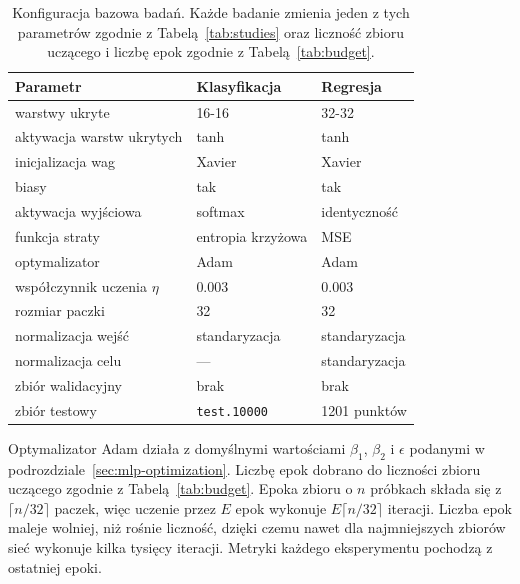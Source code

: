\begin{table}[H]
    \centering
    \caption{Konfiguracja bazowa badań. Każde badanie zmienia jeden z tych parametrów zgodnie z Tabelą~\ref{tab:studies} oraz liczność zbioru uczącego i liczbę epok zgodnie z Tabelą~\ref{tab:budget}.}
    \label{tab:base}
    \begin{tabular}{lll}
        \toprule
        Parametr & Klasyfikacja & Regresja \\
        \midrule
        warstwy ukryte & 16-16 & 32-32 \\
        aktywacja warstw ukrytych & tanh & tanh \\
        inicjalizacja wag & Xavier & Xavier \\
        biasy & tak & tak \\
        aktywacja wyjściowa & softmax & identyczność \\
        funkcja straty & entropia krzyżowa & MSE \\
        optymalizator & Adam & Adam \\
        współczynnik uczenia $\eta$ & \num{0.003} & \num{0.003} \\
        rozmiar paczki & 32 & 32 \\
        normalizacja wejść & standaryzacja & standaryzacja \\
        normalizacja celu & --- & standaryzacja \\
        zbiór walidacyjny & brak & brak \\
        zbiór testowy & \texttt{test.10000} & \num{1201} punktów \\
        \bottomrule
    \end{tabular}
\end{table}

Optymalizator Adam działa z domyślnymi wartościami $\beta_1$, $\beta_2$ i $\epsilon$ podanymi w podrozdziale~\ref{sec:mlp-optimization}. Liczbę epok dobrano do liczności zbioru uczącego zgodnie z Tabelą~\ref{tab:budget}. Epoka zbioru o $n$ próbkach składa się z $\lceil n / 32 \rceil$ paczek, więc uczenie przez $E$ epok wykonuje $E \lceil n / 32 \rceil$ iteracji. Liczba epok maleje wolniej, niż rośnie liczność, dzięki czemu nawet dla najmniejszych zbiorów sieć wykonuje kilka tysięcy iteracji. Metryki każdego eksperymentu pochodzą z ostatniej epoki.

